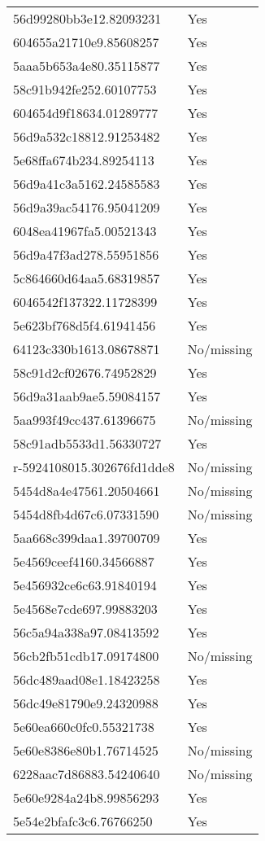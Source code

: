 \begin{tabular}{ll}
56d99280bb3e12.82093231 & Yes \\
604655a21710e9.85608257 & Yes \\
5aaa5b653a4e80.35115877 & Yes \\
58c91b942fe252.60107753 & Yes \\
604654d9f18634.01289777 & Yes \\
56d9a532c18812.91253482 & Yes \\
5e68ffa674b234.89254113 & Yes \\
56d9a41c3a5162.24585583 & Yes \\
56d9a39ac54176.95041209 & Yes \\
6048ea41967fa5.00521343 & Yes \\
56d9a47f3ad278.55951856 & Yes \\
5c864660d64aa5.68319857 & Yes \\
6046542f137322.11728399 & Yes \\
5e623bf768d5f4.61941456 & Yes \\
64123c330b1613.08678871 & No/missing \\
58c91d2cf02676.74952829 & Yes \\
56d9a31aab9ae5.59084157 & Yes \\
5aa993f49cc437.61396675 & No/missing \\
58c91adb5533d1.56330727 & Yes \\
r-5924108015.302676fd1dde8 & No/missing \\
5454d8a4e47561.20504661 & No/missing \\
5454d8fb4d67c6.07331590 & No/missing \\
5aa668c399daa1.39700709 & Yes \\
5e4569ceef4160.34566887 & Yes \\
5e456932ce6c63.91840194 & Yes \\
5e4568e7cde697.99883203 & Yes \\
56c5a94a338a97.08413592 & Yes \\
56cb2fb51cdb17.09174800 & No/missing \\
56dc489aad08e1.18423258 & Yes \\
56dc49e81790e9.24320988 & Yes \\
5e60ea660c0fc0.55321738 & Yes \\
5e60e8386e80b1.76714525 & No/missing \\
6228aac7d86883.54240640 & No/missing \\
5e60e9284a24b8.99856293 & Yes \\
5e54e2bfafc3c6.76766250 & Yes \\

\end{tabular}
